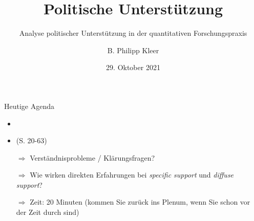 \documentclass[11pt]{beamer}
\title{Politische Unterstützung}
\subtitle{Analyse politischer Unterstützung in der quantitativen Forschungspraxis}
\date{29. Oktober 2021}
\author{B. Philipp Kleer}
\institute{Institut für Politikwissenschaft | Justus-Liebig-Universität Gießen}
\begin{document}
\begin{frame}
	\maketitle
\end{frame}

\begin{frame}[t]{Heutige Agenda}
	\begin{itemize}
		\item {}
		\item {}  (S. 20-63)
		\pause
		\item[$\Rightarrow$] Verständnisprobleme / Klärungsfragen?
		\item[$\Rightarrow$] Wie wirken direkten Erfahrungen bei \textit{specific support} und \textit{diffuse support}?
		\item[$\Rightarrow$] Zeit: 20 Minuten (kommen Sie zurück ins Plenum, wenn Sie schon vor der Zeit durch sind)
	\end{itemize}
\end{frame}
\end{document}
